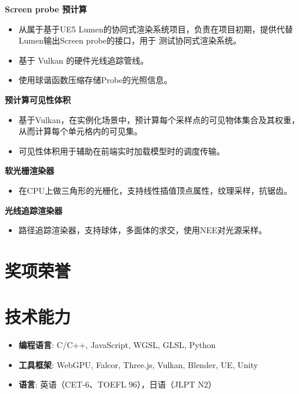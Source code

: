 \documentclass{resume}
\begin{document}
\textbf{Screen probe 预计算}
\begin{itemize}
  \item 从属于基于UE5 Lumen的协同式渲染系统项目，负责在项目初期，提供代替Lumen输出Screen probe的接口，用于
  测试协同式渲染系统。
  \item 基于 Vulkan 的硬件光线追踪管线。
  \item 使用球谐函数压缩存储Probe的光照信息。
\end{itemize}

\textbf{预计算可见性体积}
\begin{itemize}
  \item 基于Vulkan，在实例化场景中，预计算每个采样点的可见物体集合及其权重，从而计算每个单元格内的可见集。
  \item 可见性体积用于辅助在前端实时加载模型时的调度传输。
\end{itemize}

\textbf{软光栅渲染器}
\begin{itemize}
  \item 在CPU上做三角形的光栅化，支持线性插值顶点属性，纹理采样，抗锯齿。
\end{itemize}

\textbf{光线追踪渲染器}
\begin{itemize}
  \item 路径追踪渲染器，支持球体，多面体的求交，使用NEE对光源采样。
\end{itemize}

\section{奖项荣誉}
\vspace{12pt}
\section{技术能力}
\begin{itemize}[parsep=0.2ex]
  \item \textbf{编程语言}: C/C++, JavaScript, WGSL, GLSL, Python
  \item \textbf{工具框架}: WebGPU, Falcor, Three.js, Vulkan, Blender, UE, Unity
  \item \textbf{语言}: 英语（CET-6、TOEFL 96），日语（JLPT N2）
\end{itemize}
\end{document}
